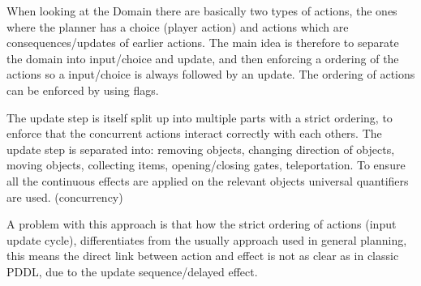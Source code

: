 		When looking at the Domain there are basically two types of actions, the ones where the planner has a choice (player action) and actions which are consequences/updates of earlier actions. The main idea is therefore to separate the domain into input/choice and update, and then enforcing a ordering of the actions so a input/choice is always followed by an update. The ordering of actions can be enforced by using flags.	
		
		The update step is itself split up into multiple parts with a strict ordering, to enforce that the concurrent actions interact correctly with each others. The update step is separated into: removing objects, changing direction of objects, moving objects, collecting items, opening/closing gates, teleportation. To ensure all the continuous effects are applied on the relevant objects universal quantifiers are used. (concurrency)
		
		A problem with this approach is that how the strict ordering of actions (input update cycle), differentiates from the usually approach used in general planning, this means the direct link between action and effect is not as clear as in classic PDDL, due to the update sequence/delayed effect. 
		
	

	
	

